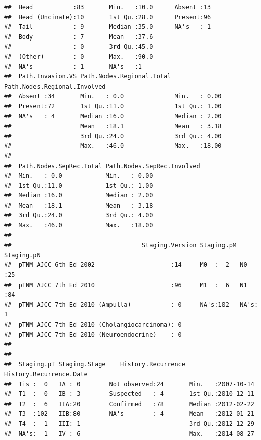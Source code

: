 \documentclass{article}
\begin{document}
\begin{knitrout}
\begin{kframe}
\begin{verbatim}
##  Head           :83       Min.   :10.0      Absent :13      
##  Head (Uncinate):10       1st Qu.:28.0      Present:96      
##  Tail           : 9       Median :35.0      NA's   : 1      
##  Body           : 7       Mean   :37.6                      
##                 : 0       3rd Qu.:45.0                      
##  (Other)        : 0       Max.   :90.0                      
##  NA's           : 1       NA's   :1                         
##  Path.Invasion.VS Path.Nodes.Regional.Total Path.Nodes.Regional.Involved
##  Absent :34       Min.   : 0.0              Min.   : 0.00               
##  Present:72       1st Qu.:11.0              1st Qu.: 1.00               
##  NA's   : 4       Median :16.0              Median : 2.00               
##                   Mean   :18.1              Mean   : 3.18               
##                   3rd Qu.:24.0              3rd Qu.: 4.00               
##                   Max.   :46.0              Max.   :18.00               
##                                                                         
##  Path.Nodes.SepRec.Total Path.Nodes.SepRec.Involved
##  Min.   : 0.0            Min.   : 0.00             
##  1st Qu.:11.0            1st Qu.: 1.00             
##  Median :16.0            Median : 2.00             
##  Mean   :18.1            Mean   : 3.18             
##  3rd Qu.:24.0            3rd Qu.: 4.00             
##  Max.   :46.0            Max.   :18.00             
##                                                    
##                                    Staging.Version Staging.pM Staging.pN
##  pTNM AJCC 6th Ed 2002                     :14     M0  :  2   N0  :25   
##  pTNM AJCC 7th Ed 2010                     :96     M1  :  6   N1  :84   
##  pTNM AJCC 7th Ed 2010 (Ampulla)           : 0     NA's:102   NA's: 1   
##  pTNM AJCC 7th Ed 2010 (Cholangiocarcinoma): 0                          
##  pTNM AJCC 7th Ed 2010 (Neuroendocrine)    : 0                          
##                                                                         
##                                                                         
##  Staging.pT Staging.Stage    History.Recurrence History.Recurrence.Date
##  Tis :  0   IA : 0        Not observed:24       Min.   :2007-10-14     
##  T1  :  0   IB : 3        Suspected   : 4       1st Qu.:2010-12-11     
##  T2  :  6   IIA:20        Confirmed   :78       Median :2012-02-22     
##  T3  :102   IIB:80        NA's        : 4       Mean   :2012-01-21     
##  T4  :  1   III: 1                              3rd Qu.:2012-12-29     
##  NA's:  1   IV : 6                              Max.   :2014-08-27     

\end{verbatim}
\end{kframe}
\end{knitrout}
\end{document}
